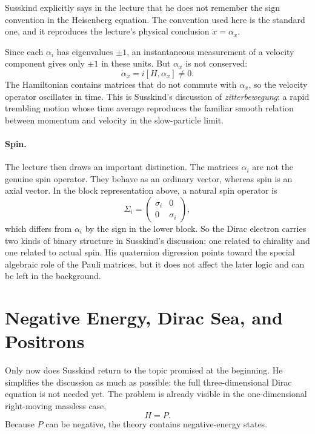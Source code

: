 \begin{remark}
Susskind explicitly says in the lecture that he does not remember the sign convention in the Heisenberg equation. The convention used here is the standard one, and it reproduces the lecture's physical conclusion \(\dot x=\alpha_x\).
\end{remark}

Since each \(\alpha_i\) has eigenvalues \(\pm1\), an instantaneous measurement of a velocity component gives only \(\pm1\) in these units. But \(\alpha_x\) is not conserved:
\begin{equation}
\dot\alpha_x=i[H,\alpha_x]\neq0.
\end{equation}
The Hamiltonian contains matrices that do not commute with \(\alpha_x\), so the velocity operator oscillates in time. This is Susskind's discussion of \emph{zitterbewegung}: a rapid trembling motion whose time average reproduces the familiar smooth relation between momentum and velocity in the slow-particle limit.

\paragraph{Spin.}
The lecture then draws an important distinction. The matrices \(\alpha_i\) are not the genuine spin operator. They behave as an ordinary vector, whereas spin is an axial vector. In the block representation above, a natural spin operator is
\begin{equation}
\Sigma_i=
\begin{pmatrix}
\sigma_i&0\\
0&\sigma_i
\end{pmatrix},
\end{equation}
which differs from \(\alpha_i\) by the sign in the lower block. So the Dirac electron carries two kinds of binary structure in Susskind's discussion: one related to chirality and one related to actual spin. His quaternion digression points toward the special algebraic role of the Pauli matrices, but it does not affect the later logic and can be left in the background.

\section{Negative Energy, Dirac Sea, and Positrons}

Only now does Susskind return to the topic promised at the beginning. He simplifies the discussion as much as possible: the full three-dimensional Dirac equation is not needed yet. The problem is already visible in the one-dimensional right-moving massless case,
\begin{equation}
H=P.
\end{equation}
Because \(P\) can be negative, the theory contains negative-energy states.

